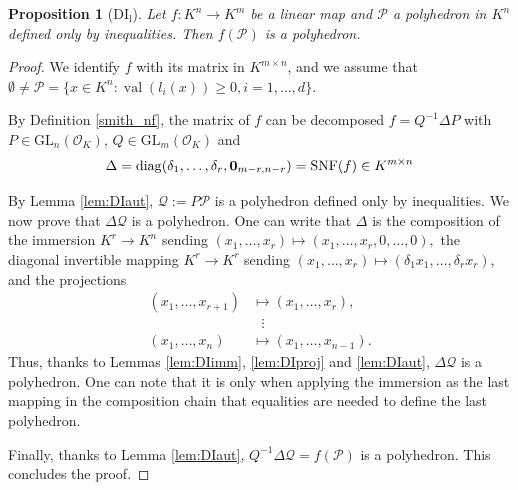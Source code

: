 \documentclass[sigconf]{acmart}
\newcommand{\N}{\mathbb{N}} %
\newcommand{\PP}{\mathcal{P}}
\newcommand{\Qc}{\mathcal{Q}}
\newtheorem{proposition}[theorem]{Proposition}
\DeclareMathOperator{\val}{val}
\newcommand{\OK}{\mathcal{O}_K}
\def\diag{\mathrm{diag}}
\newcommand{\GL}{\mathrm{GL}}
\providecommand{\DIFaddbegin}{} %
\providecommand{\DIFaddend}{} %
\providecommand{\DIFdelbegin}{} %
\providecommand{\DIFdelend}{} %
\newcommand{\DIFscaledelfig}{0.5}
\newlength{\DIFdelgraphicswidth} %
\newlength{\DIFdelgraphicsheight} %
\newcommand{\DIFaddincludegraphics}[2][]{{\color{blue}\fbox{\DIFOincludegraphics[#1]{#2}}}} %
\newcommand{\DIFdelincludegraphics}[2][]{%
\sbox{\DIFdelgraphicsbox}{\DIFOincludegraphics[#1]{#2}}%
\settoboxwidth{\DIFdelgraphicswidth}{\DIFdelgraphicsbox} %
\settoboxtotalheight{\DIFdelgraphicsheight}{\DIFdelgraphicsbox} %
\scalebox{\DIFscaledelfig}{%
\parbox[b]{\DIFdelgraphicswidth}{\usebox{\DIFdelgraphicsbox}\\[-\baselineskip] \rule{\DIFdelgraphicswidth}{0em}}\llap{\resizebox{\DIFdelgraphicswidth}{\DIFdelgraphicsheight}{%
\setlength{\unitlength}{\DIFdelgraphicswidth}%
\begin{picture}(1,1)%
\thicklines\linethickness{2pt} %
{\color[rgb]{1,0,0}\put(0,0){\framebox(1,1){}}}%
{\color[rgb]{1,0,0}\put(0,0){\line( 1,1){1}}}%
{\color[rgb]{1,0,0}\put(0,1){\line(1,-1){1}}}%
\end{picture}%
}\hspace*{3pt}}} %
} %
\DeclareRobustCommand{\DIFaddbegin}{\DIFOaddbegin \let\includegraphics\DIFaddincludegraphics} %
\DeclareRobustCommand{\DIFaddend}{\DIFOaddend \let\includegraphics\DIFOincludegraphics} %
\DeclareRobustCommand{\DIFdelbegin}{\DIFOdelbegin \let\includegraphics\DIFdelincludegraphics} %
\DeclareRobustCommand{\DIFdelend}{\DIFOaddend \let\includegraphics\DIFOincludegraphics} %
\begin{document}
\begin{proposition}[DI${}_{\mathrm{l}}$]
Let $f : K^n \to K^m$ be a linear map and $\PP$ a polyhedron in $K^n$ defined only by inequalities.
Then $f(\PP)$ is a polyhedron. \label{prop:DIl}
\end{proposition}
\begin{proof}
  We identify $f$ with its matrix in $K^{m \times n}$, and we
  assume that $\emptyset \neq \PP = \{x \in K^n : \val(l_i(x)) \geq 0, i=1,\ldots,d\}$.

  By Definition \ref{smith_nf}, the matrix of $f$ can be decomposed
  $f = Q^{-1} \Delta P$ with $P \in \GL_n(\OK)$, $Q \in \GL_m(\OK)$ and
  $$
  \Delta = \diag(\delta_1, \ldots, \delta_r, {\bf 0}_{m-r,n-r}) = \mathrm{SNF}(f)\in K^{m \times n}
  $$

By Lemma \ref{lem:DIaut}, $\Qc := P \PP$ is a polyhedron defined only by inequalities.
We now prove that $\Delta \Qc$ is a polyhedron. One can write that $\Delta$ is the composition
of the immersion 
$K^r \rightarrow K^n$ sending
$(x_1,\dots,x_r)\mapsto (x_1,\dots,x_r,0,\dots,0),$ 
 the diagonal invertible mapping
$K^r \rightarrow K^r$ sending
$(x_1,\dots,x_r)\mapsto (\delta_1 x_1,\dots,\delta_r x_r)$,
and the projections
\begin{equation*}
  \DIFdelbegin %
\DIFdelend \DIFaddbegin \begin{aligned}
    (x_1,\dots,x_{r+1}) &\mapsto (x_1,\dots,x_{r}),   \\
    & \,\,\,\, \vdots \\
    (x_1,\dots,x_{n}) &\mapsto (x_1,\dots,x_{n-1}).
  \end{aligned}\DIFaddend 
\end{equation*}
Thus, thanks to Lemmas \ref{lem:DIimm}, \ref{lem:DIproj} and \ref{lem:DIaut},
$\Delta \Qc$ is a polyhedron. One can note that it is only when applying the
immersion as the last mapping in the composition chain that equalities are
needed to define the last polyhedron.

Finally, thanks to Lemma \ref{lem:DIaut},
$Q^{-1} \Delta \Qc = f(\PP)$ is a polyhedron.
This concludes the proof.
\end{proof}
\end{document}
